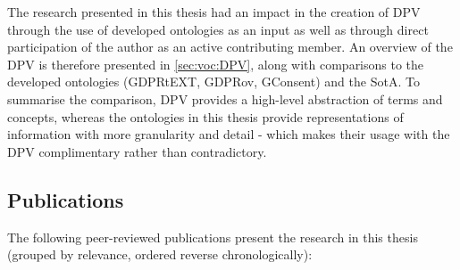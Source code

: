 The research presented in this thesis had an impact in the creation of DPV through the use of developed ontologies as an input as well as through direct participation of the author as an active contributing member.
An overview of the DPV is therefore presented in \autoref{sec:voc:DPV}, along with comparisons to the developed ontologies (GDPRtEXT, GDPRov, GConsent) and the SotA.
To summarise the comparison, DPV provides a high-level abstraction of terms and concepts, whereas the ontologies in this thesis provide representations of information with more granularity and detail - which makes their usage with the DPV complimentary rather than contradictory.

\subsection{Publications}\label{sec:intro:publications}
The following peer-reviewed publications present the research in this thesis (grouped by relevance, ordered reverse chronologically):

